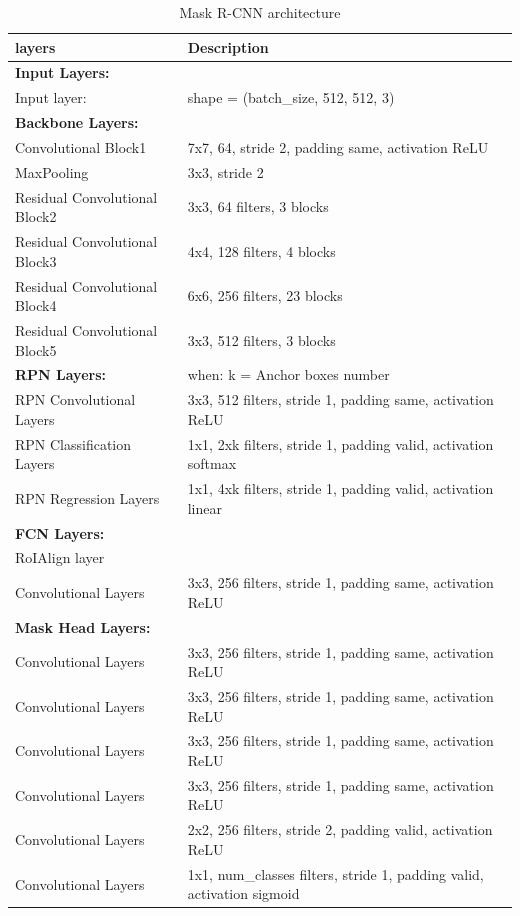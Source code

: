 \documentclass[12pt,oneside,openright,a4paper]{cpe-thai-project}
\begin{document}
\begin{itemize}
\begin{table}[!h]
\centering
\caption{Mask R-CNN architecture}\label{tbl:maskrcnnarchitech}
\begin{tabular}{p{}>{\raggedright\arraybackslash}p{}}
\toprule
layers  & Description  \\ \midrule
\textbf{Input Layers:} &  \\
\quad Input layer: & shape = (batch\_size, 512, 512, 3) \\ 
\textbf{Backbone Layers: } & \\
\quad Convolutional Block1 & 7x7, 64, stride 2, padding same, activation ReLU \\
\quad MaxPooling & 3x3, stride 2 \\
\quad Residual Convolutional Block2 & 3x3, 64 filters, 3 blocks \\
\quad Residual Convolutional Block3 & 4x4, 128 filters, 4 blocks \\
\quad Residual Convolutional Block4 & 6x6, 256 filters, 23 blocks \\
\quad Residual Convolutional Block5 & 3x3, 512 filters, 3 blocks \\
\textbf{RPN Layers:} & when: k = Anchor boxes number\\
\quad RPN Convolutional Layers & 3x3, 512 filters, stride 1, padding same, activation ReLU \\
\quad RPN Classification Layers & 1x1, 2xk filters, stride 1, padding valid, activation softmax \\
\quad RPN Regression Layers & 1x1, 4xk filters, stride 1, padding valid, activation linear \\
\textbf{FCN Layers:} & \\
\quad RoIAlign layer &  \\
\quad Convolutional Layers & 3x3, 256 filters, stride 1, padding same, activation ReLU \\
\textbf{Mask Head Layers:} & \\ 
\quad Convolutional Layers & 3x3, 256 filters, stride 1, padding same, activation ReLU \\ 
\quad Convolutional Layers & 3x3, 256 filters, stride 1, padding same, activation ReLU \\ 
\quad Convolutional Layers & 3x3, 256 filters, stride 1, padding same, activation ReLU \\ 
\quad Convolutional Layers & 3x3, 256 filters, stride 1, padding same, activation ReLU \\ 
\quad Convolutional Layers & 2x2, 256 filters, stride 2, padding valid, activation ReLU \\ 
\quad Convolutional Layers & 1x1, num\_classes filters, stride 1, padding valid, activation sigmoid \\ 
\hline
\end{tabular}
\end{table}


\end{itemize}
\end{document}
